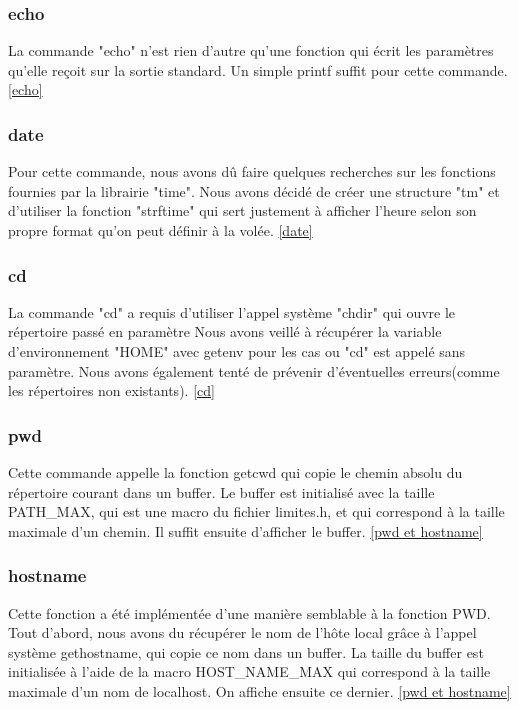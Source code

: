 \documentclass[12pt]{article}
\begin{document}
\subsubsection{echo}
 La commande "echo" n'est rien d'autre qu'une fonction qui écrit les paramètres qu'elle reçoit
 sur la sortie standard. Un simple printf suffit pour cette commande. \ref{echo}
 
\subsubsection{date}
 Pour cette commande, nous avons dû faire quelques recherches sur les fonctions fournies par la librairie "time".
 Nous avons décidé de créer une structure "tm" et d'utiliser la fonction "strftime" qui
 sert justement à afficher l'heure selon son propre format qu'on peut définir à la volée. \ref{date}
 
 \subsubsection{cd}
 La commande "cd" a requis d'utiliser l'appel système "chdir" qui ouvre le répertoire passé en paramètre
 Nous avons veillé à récupérer la variable d'environnement "HOME" avec getenv pour les cas ou "cd" est
 appelé sans paramètre. Nous avons également tenté de prévenir d'éventuelles erreurs(comme les
 répertoires non existants). \ref{cd}
 
 \subsubsection{pwd}
 Cette commande appelle la fonction getcwd qui copie le chemin absolu du répertoire 
 courant dans un buffer.
 Le buffer est initialisé avec la taille PATH\_MAX, qui est une macro du fichier limites.h,
 et qui correspond à la taille maximale d'un chemin. Il suffit ensuite d'afficher le buffer. \ref{pwd et hostname}
 
 \subsubsection{hostname}
 Cette fonction a été implémentée d'une manière semblable à la fonction PWD.
Tout d'abord, nous avons du récupérer le nom de l'hôte local grâce à l'appel système gethostname, qui copie ce nom dans un buffer. 
La taille du buffer est initialisée à l'aide de la macro HOST\_NAME\_MAX qui correspond à la taille maximale d'un nom de localhost. 
On affiche ensuite ce dernier. \ref{pwd et hostname}
 
\end{document}
